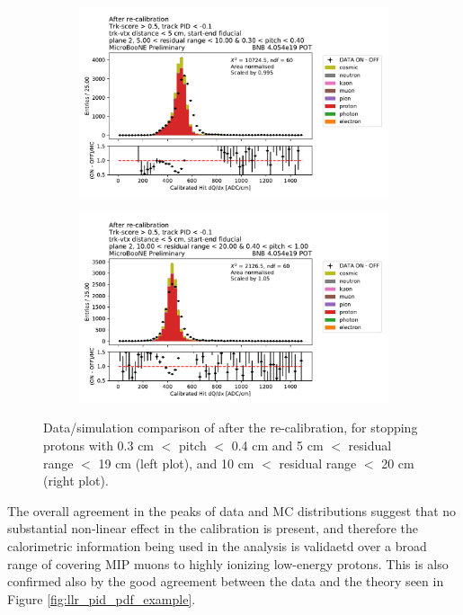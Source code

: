\begin{figure}[H] 
\begin{center}
    \begin{subfigure}[b]{0.45\textwidth}
    \centering
    \includegraphics[width=1.00\textwidth]{stopping_muons_protons/protons_500_residualrange_1000_030_pitch_040depois.pdf}
    \end{subfigure}
    \begin{subfigure}[b]{0.45\textwidth}
    \centering
    \includegraphics[width=1.00\textwidth]{stopping_muons_protons/protons_1000_residual_range_2000_040_pitch_100depois.pdf}
    \end{subfigure}
\caption{Data/simulation comparison of \dqdx after the re-calibration, for stopping protons with 0.3 cm $<$ pitch $<$ 0.4 cm and 5 cm $<$ residual range $<$ 19 cm (left plot), and 10 cm $<$ residual range $<$ 20 cm (right plot).}
\label{fig:stopping_protons_recombination}
\end{center}
\end{figure}
The overall agreement in the peaks of data and MC distributions suggest that no substantial non-linear effect in the calibration is present, and therefore the calorimetric information being used in the analysis is validaetd over a broad range of \dedx covering MIP muons to highly ionizing low-energy protons.
This is also confirmed also by the good agreement between the data and the theory seen in Figure \ref{fig:llr_pid_pdf_example}.

